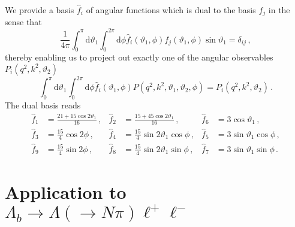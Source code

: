 \documentclass[aps,prd,reprint,nofootinbib,preprintnumbers]{revtex4}
\newcommand{\dd}{\text{d}}
\renewcommand{\theta}{\vartheta}
\begin{document}
We provide a basis $\hat{f}_i$ of angular functions which is dual to the basis $f_j$ in the sense that
\begin{equation}
    \frac{1}{4\pi}\int_0^\pi \dd\theta_1 \int_0^{2\pi}\dd \phi \hat{f}_i(\theta_1,\phi) f_j(\theta_1,\phi) \sin\theta_1 = \delta_{ij}\,,
\end{equation}
thereby enabling us to project out exactly one of the angular
observables $P_i(q^2, k^2, \theta_2)$
\begin{equation}
    \int_0^\pi \dd\theta_1 \int_0^{2\pi}\dd \phi \hat{f}_i(\theta_1,\phi) P(q^2, k^2, \theta_1,\theta_2,\phi) = P_i(q^2, k^2, \theta_2)\,.
\end{equation}
The dual basis reads
\begin{equation}
\begin{aligned}
    \hat{f}_1 & = \frac{21 + 15 \cos 2\theta_1}{16}\,, &
    \hat{f}_2 & = \frac{15 + 45 \cos 2\theta_1}{16}\,, &
    \hat{f}_6 & = 3 \cos\theta_1                   \,, \\
    \hat{f}_3 & = \frac{15}{4}                \cos 2\phi     \,, &
    \hat{f}_4 & = \frac{15}{4} \sin 2\theta_1 \cos  \phi     \,, &
    \hat{f}_5 & = 3            \sin  \theta_1 \cos  \phi     \,, \\
    \hat{f}_9 & = \frac{15}{4}                \sin 2\phi     \,, &
    \hat{f}_8 & = \frac{15}{4} \sin 2\theta_1 \sin  \phi     \,, &
    \hat{f}_7 & = 3            \sin  \theta_1 \sin  \phi     \,.
\end{aligned}
\end{equation}


\section{Application to $\Lambda_b\to \Lambda(\to N \pi)\ell^+\ell^-$}
\label{app:lambdabtolambdall}
\end{document}
